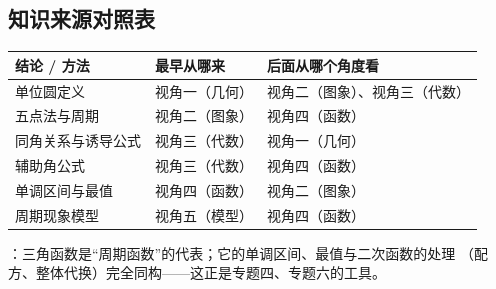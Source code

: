 \begin{afterclass}
\subsection{知识来源对照表}
\begin{center}
\footnotesize
\setlength{\tabcolsep}{4pt}
\renewcommand{\arraystretch}{1.35}
\begin{tabular}{p{3.4cm}p{4.0cm}p{5.6cm}}
\toprule
结论 / 方法 & 最早从哪来 & 后面从哪个角度看 \\
\midrule
单位圆定义 & 视角一（几何） & 视角二（图象）、视角三（代数） \\
五点法与周期 & 视角二（图象） & 视角四（函数） \\
同角关系与诱导公式 & 视角三（代数） & 视角一（几何） \\
辅助角公式 & 视角三（代数） & 视角四（函数） \\
单调区间与最值 & 视角四（函数） & 视角二（图象） \\
周期现象模型 & 视角五（模型） & 视角四（函数） \\
\bottomrule
\end{tabular}
\end{center}

：三角函数是“周期函数”的代表；它的单调区间、最值与二次函数的处理
（配方、整体代换）完全同构——这正是专题四、专题六的工具。
\end{afterclass}
